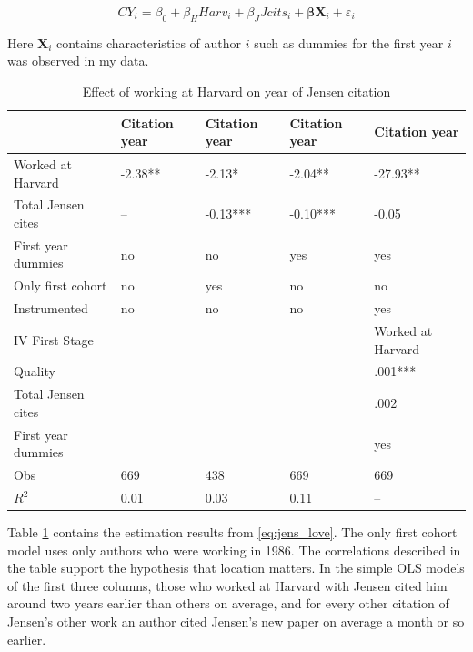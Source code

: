 \documentclass[]{article}
\begin{document}
\begin{equation}
    CY_i = \beta_0 + \beta_H Harv_i + \beta_J Jcits_i + \mathbf{\beta} \mathbf{X}_i + \varepsilon_i
    \label{eq:jens_love}
\end{equation}

Here $\mathbf{X}_i$ contains characteristics of author $i$ such as dummies for
the first year $i$ was observed in my data.  


\begin{table}[h!]
    \begin{tabular}{|l|llll|}
        \hline
                           & Citation year & Citation year & Citation year & Citation year \\ \hline
        Worked at Harvard  & -2.38**       & -2.13*        & -2.04**       & -27.93**      \\
        Total Jensen cites & --            & -0.13***      & -0.10***      & -0.05         \\
        First year dummies & no            & no            & yes           & yes           \\
        Only first cohort  & no            & yes           & no            & no            \\
        Instrumented       & no            & no            & no            & yes           \\ \hline \hline
        IV First Stage     &               &               &               & Worked at Harvard \\ \hline
        Quality            &               &               &               & .001***       \\
        Total Jensen cites &               &               &               & .002          \\
        First year dummies &               &               &               & yes           \\ \hline
        Obs                & 669           & 438           & 669           & 669           \\
        $R^2$              & 0.01          & 0.03          & 0.11          & --            \\ \hline \hline

    \end{tabular}
    \caption{Effect of working at Harvard on year of Jensen citation}
    \label{tab:jens_love}
\end{table}

Table \ref{tab:jens_love} contains the estimation results from \eqref{eq:jens_love}.
The only first cohort model uses only authors who were working in 1986.  The
correlations described in the table support the hypothesis that location matters.
In the simple OLS models of the first three columns, those who worked at
Harvard with Jensen cited him around two years earlier than others on
average, and for every other citation of Jensen's other work an author
cited Jensen's new paper on average a month or so earlier.
\end{document}
